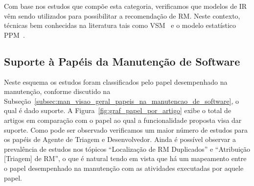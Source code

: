 Com base nos estudos que compõe esta categoria, verificamos que modelos de IR
vêm sendo utilizados para possibilitar a recomendação de RM\@. Neste contexto,
técnicas bem conhecidas na literatura tais como VSM~\cite{Wang2011bug} e o
modelo estatístico PPM~\cite{malheiros2012source}.

\subsection{Suporte à Papéis da Manutenção de Software}
\label{sub:extensões_com_suporte_a_papeis}

Neste esquema os estudos foram classificados pelo papel desempenhado na
manutenção, conforme discutido na
Subseção~\ref{subsec:man_visao_geral_papeis_na_manutencao_de_software}, o qual é
dado suporte. A Figura~\ref{fig:graf_papel_por_artigo} exibe o total de artigos
em comparação com o papel ao qual a funcionalidade proposta visa dar suporte.
Como pode ser observado verificamos um maior número de estudos para os papéis de
Agente de Triagem e Desenvolvedor. Ainda é possível observar a prevalência de
estudos nos tópicos ``Localização de RM Duplicados'' e ``Atribuição [Triagem] de
RM'', o que é natural tendo em vista que há um mapeamento entre o papel
desempenhado na manutenção com as atividades executadas por aquele papel.

\begin{table}[htpb]
\centering
{}
\caption{Total de artigos por papel na manutenção de software}
\label{tab:graf_papel_por_artigo}
\end{table}

